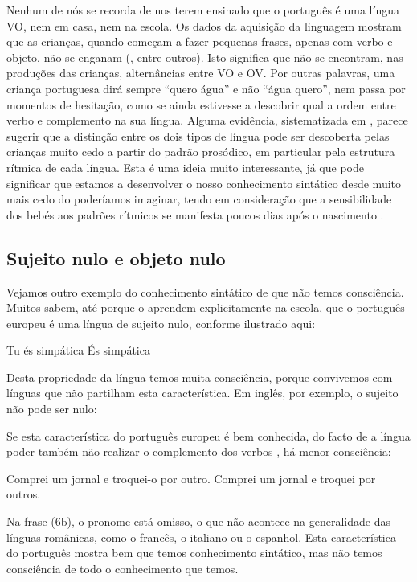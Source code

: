 \documentclass[output=paper,colorlinks,citecolor=brown,booklanguage=portuguese]{langscibook}
\begin{document}
Nenhum de nós se recorda de nos terem ensinado que o português é uma língua VO, nem em casa, nem na escola. Os dados da aquisição da linguagem mostram que as crianças, quando começam a fazer pequenas frases, apenas com verbo e objeto, não se enganam (\citealp{Guasti2002}, entre outros). Isto significa que não se encontram, nas produções das crianças, alternâncias entre VO e OV. Por outras palavras, uma criança portuguesa dirá sempre “quero água” e não “água quero”, nem passa por momentos de hesitação, como se ainda estivesse a descobrir qual a ordem entre verbo e complemento na sua língua.  Alguma evidência, sistematizada em \citet{Nespor2008}, parece sugerir que a distinção entre os dois tipos de língua pode ser descoberta pelas crianças muito cedo a partir do padrão prosódico, em particular pela estrutura rítmica de cada língua. Esta é uma ideia muito interessante, já que pode significar que estamos a desenvolver o nosso conhecimento sintático desde muito mais cedo do poderíamos imaginar, tendo em consideração que a sensibilidade dos bebés aos padrões rítmicos se manifesta poucos dias após o nascimento \citep{Mehler2000}. 

\subsection{Sujeito nulo e objeto nulo}

Vejamos outro exemplo do conhecimento sintático de que não temos consciência. Muitos sabem, até porque o aprendem explicitamente na escola, que o português europeu é uma língua de sujeito nulo, conforme ilustrado aqui:

\ea\label{ex:cap2ex4} 
    \ea Tu és simpática
    \ex És simpática
\z
\z

Desta propriedade da língua temos muita consciência, porque convivemos com línguas que não partilham esta característica. Em inglês, por exemplo, o sujeito não pode ser nulo:

\ea\label{ex:cap2ex5} 
\z
\z

Se esta característica do português europeu é bem conhecida, do facto de a língua poder também não realizar o complemento dos verbos \citep{Raposo1986}, há menor consciência:

\ea\label{ex:cap2:ex6} 
    \ea Comprei um jornal e troquei-o por outro.
    \ex Comprei um jornal e troquei por outros.
    \z
    \z
    
Na frase (6b), o pronome está omisso, o que não acontece na generalidade das línguas românicas, como o francês, o italiano ou o espanhol. Esta característica do português mostra bem que temos conhecimento sintático, mas não temos consciência de todo o conhecimento que temos.
\end{document}
